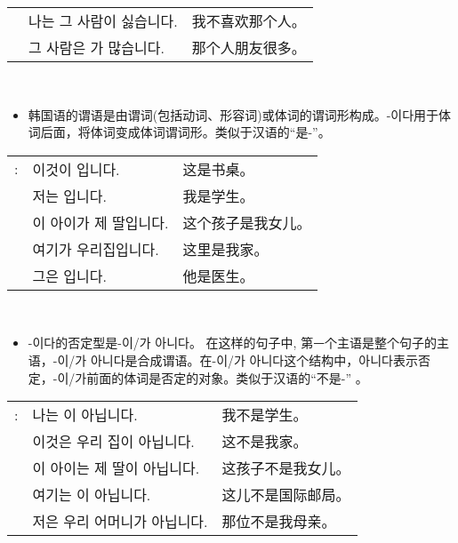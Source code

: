 \begin{grammar}
\begin{grammarsect}[\kr -이/-가]
\begin{tabular}{lll}
            &\kr 나는 그 사람이 싫습니다.&我不喜欢那个人。\\
            &\kr 그 사람은 \ruby{親舊}{친구}가 많습니다.&那个人朋友很多。
        \end{tabular}\\
    \end{grammarsect}
    \begin{grammarsect}[\kr -이다]
        \begin{itemize}
            \item 韩国语的谓语是由谓词(包括动词、形容词)或体词的谓词形构成。{\kr -이다}用于体词后面，将体词变成体词谓词形。类似于汉语的“是-”。
        \end{itemize}
        \begin{tabular}{lll}
            \kr \ruby{例}{예}: &\kr 이것이 \ruby{冊床}{책상}입니다.&这是书桌。\\
            &\kr 저는 \ruby{學生}{학생}입니다.&我是学生。\\
            &\kr 이 아이가 제 딸입니다.&这个孩子是我女儿。\\
            &\kr 여기가 우리집입니다.&这里是我家。\\
            &\kr 그\ruby{分}{분}은 \ruby{醫師}{의사}입니다.&他是医生。
        \end{tabular}\\
    \end{grammarsect}
    \begin{grammarsect}
        \begin{itemize}
            \item {\kr -이다}的否定型是{\kr -이/가 아니다}。 在这样的句子中, 第ᅳ个主语是整个句子的主语，{\kr -이/가 아니다}是合成谓语。在{\kr -이/가 아니다}这个结构中，{\kr 아니다}表示否定，{\kr -이/가}前面的体词是否定的对象。类似于汉语的“不是-” 。
        \end{itemize}
        \begin{tabular}{lll}
            \kr \ruby{例}{예}:&\kr 나는 \ruby{學生}{학생}이 아닙니다.&我不是学生。\\
            &\kr 이것은 우리 집이 아닙니다.&这不是我家。\\
            &\kr 이 아이는 제 딸이 아닙니다.&这孩子不是我女儿。\\
            &\kr 여기는 \ruby{國際郵遞局}{국제우체국}이 아닙니다.&这儿不是国际邮局。\\
            &\kr 저\ruby{分}{분}은 우리 어머니가 아닙니다.&那位不是我母亲。
        \end{tabular}\\
    \end{grammarsect}
\end{grammar}
